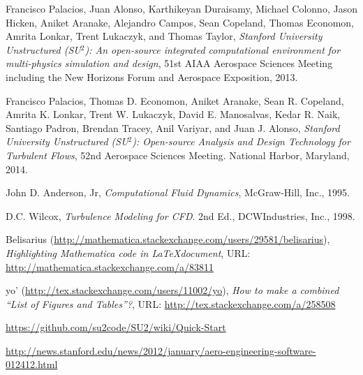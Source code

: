 \documentclass[10pt, titlepage]{article}
\begin{document}
\newpage
\begin{thebibliography}{9}

Francisco Palacios, Juan Alonso, Karthikeyan Duraisamy, Michael Colonno, Jason Hicken, Aniket Aranake, Alejandro Campos, Sean Copeland, Thomas Economon, Amrita Lonkar, Trent Lukaczyk, and Thomas Taylor, \emph{Stanford University Unstructured (SU$^2$): An open-source integrated computational environment for multi-physics simulation and design}, 51st AIAA Aerospace Sciences Meeting including the New Horizons Forum and Aerospace Exposition, 2013.

Francisco Palacios, Thomas D. Economon, Aniket Aranake, Sean R. Copeland, Amrita K. Lonkar, Trent W. Lukaczyk, David E. Manosalvas, Kedar R. Naik, Santiago Padron, Brendan Tracey, Anil Variyar, and Juan J. Alonso, \emph{Stanford University Unstructured (SU$^2$): Open-source Analysis and Design Technology for Turbulent Flows}, 52nd Aerospace Sciences Meeting. National Harbor, Maryland, 2014.

John D. Anderson, Jr, \emph{Computational Fluid Dynamics}, McGraw-Hill, Inc., 1995.

D.C. Wilcox, \emph{Turbulence Modeling for CFD}. 2nd Ed., DCWIndustries, Inc., 1998.

Belisarius (\url{http://mathematica.stackexchange.com/users/29581/belisarius}), \emph{Highlighting Mathematica code in \LaTeX document}, URL: \url{http://mathematica.stackexchange.com/a/83811}

yo' (\url{http://tex.stackexchange.com/users/11002/yo}), \emph{How to make a combined “List of Figures and Tables”?}, URL: \url{http://tex.stackexchange.com/a/258508}

\url{https://github.com/su2code/SU2/wiki/Quick-Start}

\url{http://news.stanford.edu/news/2012/january/aero-engineering-software-012412.html}

\end{thebibliography}
\end{document}
